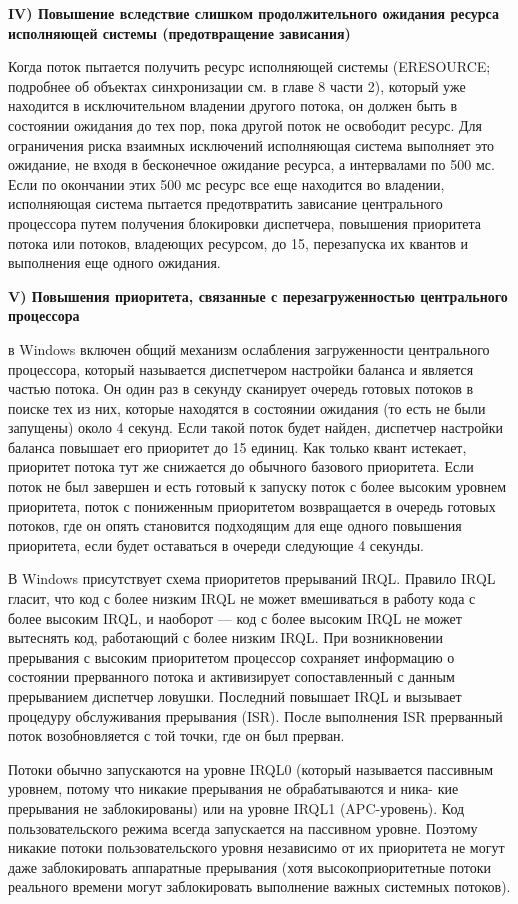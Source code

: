 \documentclass[14pt, a4paper]{extarticle}
\begin{document}
	
	\textbf{IV)  Повышение вследствие слишком продолжительного ожидания ресурса
	исполняющей системы (предотвращение зависания)}\par
	
	Когда поток пытается получить ресурс исполняющей системы (ERESOURCE; подробнее об объектах синхронизации см. в главе 8 части 2), который уже находится
	в исключительном владении другого потока, он должен быть в состоянии ожидания до тех пор, пока другой поток не освободит ресурс. Для ограничения риска
	взаимных исключений исполняющая система выполняет это ожидание, не входя
	в бесконечное ожидание ресурса, а интервалами по 500 мс. Если по окончании
	этих 500 мс ресурс все еще находится во владении, исполняющая система пытается
	предотвратить зависание центрального процессора путем получения блокировки
	диспетчера, повышения приоритета потока или потоков, владеющих ресурсом, до
	15, перезапуска их квантов и выполнения еще одного ожидания.
	
 	
 	\textbf{V) Повышения приоритета, связанные
 	с перезагруженностью центрального процессора}\par
 	
 	в Windows включен общий механизм ослабления загруженности центрального процессора, который называется диспетчером настройки баланса и является частью потока. Он один раз в секунду сканирует очередь готовых
 	потоков в поиске тех из них, которые находятся в состоянии ожидания (то есть не
 	были запущены) около 4 секунд. Если такой поток будет найден, диспетчер
 	настройки баланса повышает его приоритет до 15 единиц. Как только квант
 	истекает, приоритет потока тут же снижается до обычного базового приоритета.
 	Если поток не был завершен и есть готовый к запуску поток с более высоким
 	уровнем приоритета, поток с пониженным приоритетом возвращается в очередь
 	готовых потоков, где он опять становится подходящим для еще одного повышения
 	приоритета, если будет оставаться в очереди следующие 4 секунды.\newline\par
 	
 	В Windows присутствует схема приоритетов прерываний IRQL.
 	Правило IRQL гласит, что код с более низким IRQL не может
 	вмешиваться в работу кода с более высоким IRQL, и наоборот — код с более высоким IRQL не может вытеснять код, работающий с более низким IRQL. При возникновении
 	прерывания с высоким приоритетом процессор сохраняет информацию о
 	состоянии прерванного потока и активизирует сопоставленный с данным
 	прерыванием диспетчер ловушки. Последний повышает IRQL и вызывает
 	процедуру обслуживания прерывания (ISR). После выполнения ISR прерванный
 	поток возобновляется с той точки, где он был прерван.\par
 	Потоки обычно запускаются на уровне IRQL0 (который называется пассивным
 	уровнем, потому что никакие прерывания не обрабатываются и ника- кие
 	прерывания не заблокированы) или на уровне IRQL1 (APC-уровень). Код
 	пользовательского режима всегда запускается на пассивном уровне. Поэтому
 	никакие потоки пользовательского уровня независимо от их приоритета не могут
 	даже заблокировать аппаратные прерывания (хотя высокоприоритетные потоки
 	реального времени могут заблокировать выполнение важных системных потоков). 
 	
\end{document}
